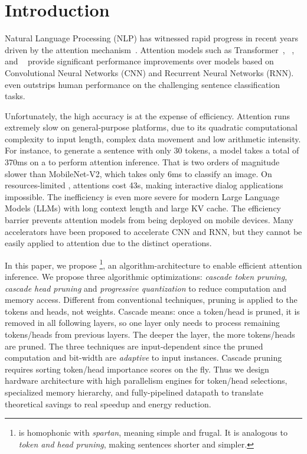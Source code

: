 \section{Introduction}

Natural Language Processing (NLP) has witnessed rapid progress in recent years driven by the attention mechanism~\cite{46201}. 
Attention models such as Transformer~\cite{46201}, \bert~\cite{devlin2018bert}, and \gpttwo~\cite{radford2019language} provide significant performance improvements over models based on Convolutional Neural Networks (CNN) and Recurrent Neural Networks (RNN). \bert~\cite{devlin2018bert} even outstrips human performance on the challenging sentence classification~\cite{wang-etal-2018-glue} tasks. 

Unfortunately, the high accuracy is at the expense of efficiency. Attention runs extremely slow on general-purpose platforms, due to its quadratic computational complexity to input length, complex data movement and low arithmetic intensity. 
For instance, to generate a sentence with only 30 tokens, a \gpttwo model takes a total of 370ms on a \titanxp \xspace to perform attention inference. That is two orders of magnitude slower than MobileNet-V2, which takes only 6ms to classify an image. 
On resources-limited \rasp, attentions cost 43s, making interactive dialog applications impossible. The inefficiency is even more severe for modern Large Language Models (LLMs) with long context length and large KV cache.
The efficiency barrier prevents attention models from being deployed on mobile devices. 
Many accelerators have been proposed to accelerate CNN and RNN, but they cannot be easily applied to attention due to the distinct operations. 


In this paper, we propose \name\footnote{\name is homophonic with \emph{spartan}, meaning simple and frugal. It is analogous to \emph{token and head pruning}, making sentences shorter and simpler.}, an algorithm-architecture \codesign to enable efficient attention inference. We propose three algorithmic optimizations: \emph{cascade token pruning}, \emph{cascade head pruning} and \emph{progressive quantization} to reduce computation and memory access. Different from conventional techniques, pruning is applied to the tokens and heads, not weights. Cascade means: once a token/head is pruned, it is removed in all following layers, so one layer only needs to process remaining tokens/heads from previous layers. The deeper the layer, the more tokens/heads are pruned. The three techniques are input-dependent since the pruned computation and bit-width are \emph{adaptive} to input instances. Cascade pruning requires sorting token/head importance scores on the fly. Thus we design hardware architecture with high parallelism \topk engines for token/head selections, specialized memory hierarchy, and fully-pipelined datapath to translate theoretical savings to real speedup and energy reduction.


